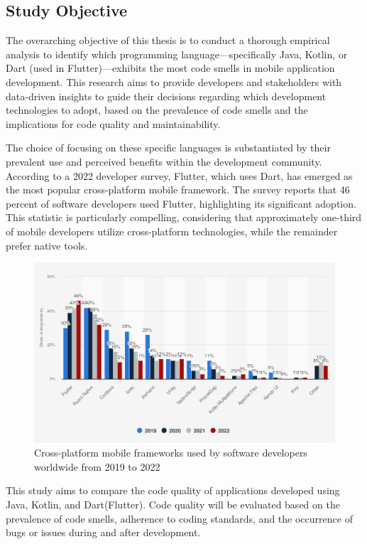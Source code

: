\subsection{Study Objective}
The overarching objective of this thesis is to conduct a thorough empirical analysis to identify which programming language—specifically Java, Kotlin, or Dart (used in Flutter)—exhibits the most code smells in mobile application development. This research aims to provide developers and stakeholders with data-driven insights to guide their decisions regarding which development technologies to adopt, based on the prevalence of code smells and the implications for code quality and maintainability.\par
The choice of focusing on these specific languages is substantiated by their prevalent use and perceived benefits within the development community. According to a 2022 developer survey, Flutter, which uses Dart, has emerged as the most popular cross-platform mobile framework. The survey reports that 46 percent of software developers used Flutter, highlighting its significant adoption. This statistic is particularly compelling, considering that approximately one-third of mobile developers utilize cross-platform technologies, while the remainder prefer native tools.\begin{figure}[htbp]
    \centering
    \includegraphics[scale = 0.45]{img/cross_platform-sts.png}
    \caption{Cross-platform mobile frameworks used by software developers worldwide from 2019 to 2022 \cite{jetbrains2022}}
    \label{fig:cross_platform-sts}
\end{figure}
\par
This study aims to compare the code quality of applications developed using Java, Kotlin, and Dart(Flutter). Code quality will be evaluated based on the prevalence of code smells, adherence to coding standards, and the occurrence of bugs or issues during and after development.

